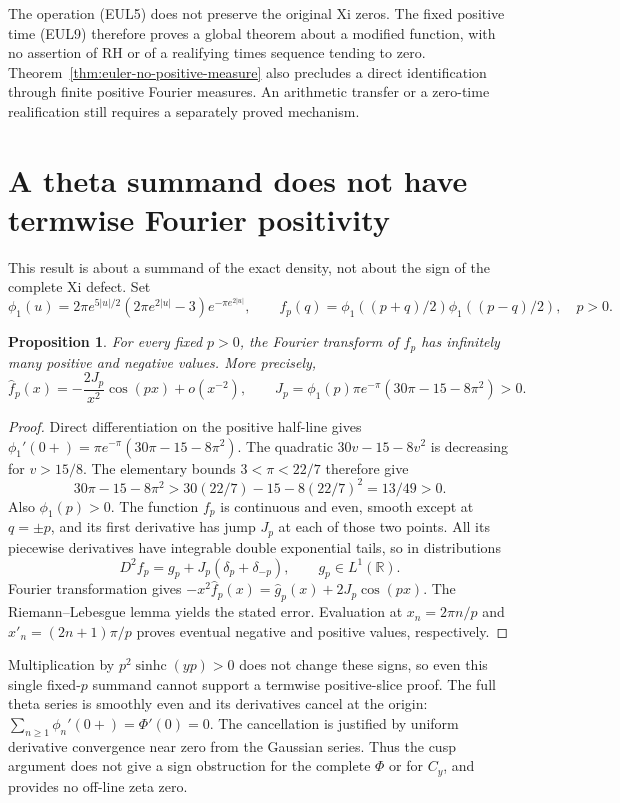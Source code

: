 \documentclass[11pt]{article}
\newtheorem{proposition}[theorem]{Proposition}
\theoremstyle{remark}\newtheorem{remark}[theorem]{Remark}
\newcommand{\R}{\mathbb R}
\newcommand{\sinhc}{\operatorname{sinhc}}
\begin{document}
The operation (EUL5) does not preserve the original Xi zeros.
The fixed positive time (EUL9) therefore proves a global theorem
about a modified function, with no assertion of RH or of a
realifying times sequence tending to zero.
Theorem~\ref{thm:euler-no-positive-measure} also precludes a direct
identification through finite positive Fourier measures.
An arithmetic transfer or a zero-time realification still requires
a separately proved mechanism.

\section{A theta summand does not have termwise Fourier positivity}
This result is about a summand of the exact density, not about
the sign of the complete Xi defect. Set
\[
 \phi_1(u)=2\pi e^{5|u|/2}(2\pi e^{2|u|}-3)
              e^{-\pi e^{2|u|}},
 \qquad
 f_p(q)=\phi_1((p+q)/2)\phi_1((p-q)/2),\quad p>0.
\]

\begin{proposition}\label{prop:cusp}
For every fixed $p>0$, the Fourier transform of $f_p$
has infinitely many positive and negative values. More precisely,
\[
 \widehat f_p(x)=-\frac{2J_p}{x^2}\cos(px)+o(x^{-2}),\qquad
 J_p=\phi_1(p)\pi e^{-\pi}(30\pi-15-8\pi^2)>0.
\]
\end{proposition}
\begin{proof}
Direct differentiation on the positive half-line gives
$\phi_1'(0+)=\pi e^{-\pi}(30\pi-15-8\pi^2)$.
The quadratic $30v-15-8v^2$ is decreasing for $v>15/8$.
The elementary bounds $3<\pi<22/7$ therefore give
\[
 30\pi-15-8\pi^2>
 30(22/7)-15-8(22/7)^2=13/49>0.
\]
Also $\phi_1(p)>0$. The function $f_p$ is continuous and
even, smooth except at $q=\pm p$, and its first derivative
has jump $J_p$ at each of those two points.
All its piecewise derivatives have integrable double
exponential tails, so in distributions
\[
 D^2f_p=g_p+J_p(\delta_p+\delta_{-p}),\qquad g_p\in L^1(\R).
\]
Fourier transformation gives
$-x^2\widehat f_p(x)=\widehat g_p(x)+2J_p\cos(px)$.
The Riemann--Lebesgue lemma yields the stated error.
Evaluation at $x_n=2\pi n/p$ and
$x'_n=(2n+1)\pi/p$ proves eventual negative and positive
values, respectively.
\end{proof}

Multiplication by $p^2\sinhc(yp)>0$ does not change these
signs, so even this single fixed-$p$ summand cannot support
a termwise positive-slice proof. The full theta series is
smoothly even and its derivatives cancel at the origin:
$\sum_{n\ge1}\phi_n'(0+)=\Phi'(0)=0$.
The cancellation is justified by uniform derivative
convergence near zero from the Gaussian series.
Thus the cusp argument does not give a sign obstruction
for the complete $\Phi$ or for $C_y$, and provides no
off-line zeta zero.
\end{document}
